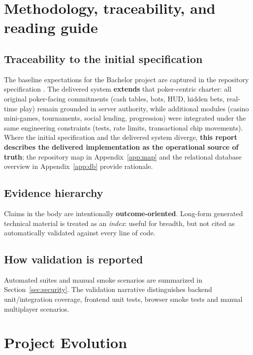 \documentclass[11pt,a4paper]{article}
\begin{document}
\section{Methodology, traceability, and reading guide}
\label{sec:methodology}

\subsection{Traceability to the initial specification}

The baseline expectations for the Bachelor project are captured in the repository specification . The delivered system \textbf{extends} that poker-centric charter: all original poker-facing commitments (cash tables, bots, HUD, hidden bets, real-time play) remain grounded in server authority, while additional modules (casino mini-games, tournaments, social lending, progression) were integrated under the same engineering constraints (tests, rate limits, transactional chip movements). Where the initial specification and the delivered system diverge, \textbf{this report describes the delivered implementation as the operational source of truth}; the repository map in Appendix~\ref{app:map} and the relational database overview in Appendix~\ref{app:db} provide rationale.

\subsection{Evidence hierarchy}

Claims in the body are intentionally \textbf{outcome-oriented}. Long-form generated technical material is treated as an \textit{index}: useful for breadth, but not cited as automatically validated against every line of code.

\subsection{How validation is reported}

Automated suites and manual smoke scenarios are summarized in Section~\ref{sec:security}. The validation narrative distinguishes backend unit/integration coverage, frontend unit tests, browser smoke tests and manual multiplayer scenarios.

\section{Project Evolution}
\label{sec:evolution}
\end{document}
